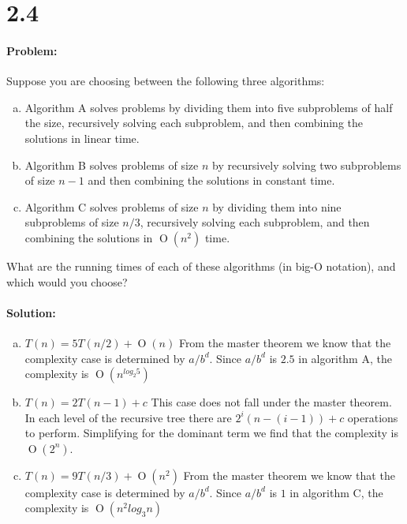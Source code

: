 \documentclass[12pt]{article}
\newcommand{\BigO}[1]{\ensuremath{\operatorname{O}\left(#1\right)}}
\begin{document}
\section*{2.4}
\paragraph{Problem:}
Suppose you are choosing between the following three algorithms:

\begin{enumerate}[(a)]
\item Algorithm A solves problems by dividing them into five subproblems
of half the size, recursively solving each subproblem, and then
combining the solutions in linear time.

\item Algorithm B solves problems of size $n$ by recursively solving two
subproblems of size $n−1$ and then combining the solutions in constant
time.

\item Algorithm C solves problems of size $n$ by dividing them into nine
subproblems of size $n/3$, recursively solving each subproblem, and then
combining the solutions in $\BigO{n^2}$ time.
\end{enumerate}

\noindent What are the running times of each of these algorithms (in big-O
notation), and which would you choose?

\paragraph{Solution:}
\begin{enumerate}[(a)]
\item $T(n) = 5T(n/2) + \BigO{n}$
    From the master theorem we know that the complexity case is determined
    by $a/b^{d}$.  Since $a/b^{d}$ is $2.5$ in algorithm A, the complexity
    is $\BigO{n^{log_2 5}}$

\item $T(n) = 2T(n-1) + c$
    This case does not fall under the master theorem.  In each level of
    the	recursive tree there are $2^{i}(n-(i-1)) +c$ operations to perform.
    Simplifying for the dominant term we find that the complexity is
    $\BigO{2^{n}}$.

\item $T(n) = 9T(n/3) + \BigO{n^2}$
    From the master theorem we know that the complexity case is determined
    by $a/b^{d}$.  Since $a/b^{d}$ is $1$ in algorithm C, the complexity is
    $\BigO{n^{2}log_3 n}$
\end{enumerate}
\end{document}
